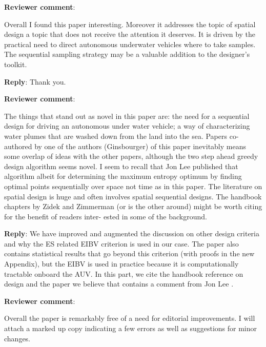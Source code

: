 \documentclass[a4paper]{article}
\newcounter{reviewer}
\def\revcom{\textbf{Reviewer comment}}
\def\reply{\textbf{Reply}}
\begin{document}
\setcounter{reviewer}{1}

\begin{answers}


\item{\revcom  :}\label{r1c3}

Overall I found this paper interesting. Moreover it addresses the topic of spatial design a topic that does not receive the attention it deserves. It is driven by the practical need to direct autonomous underwater vehicles where to take samples. The sequential sampling strategy may be a valuable addition to the designer’s toolkit.

\reply: Thank you. 

\item{\revcom  :}\label{r1c3}

The things that stand out as novel in this paper are: the need for a sequential design for driving an autonomous under water vehicle; a way of characterizing water plumes that are washed down from the land into the sea. Papers co-authored by one of the authors (Ginsbourger) of this paper inevitably means some overlap of ideas with the other papers, although the two step ahead greedy design algorithm seems novel. I seem to recall that Jon Lee published that algorithm albeit for determining the maximum entropy optimum by finding optimal points sequentially over space not time as in this paper. The literature on spatial design is huge and often involves spatial sequential designs. The handbook chapters by Zidek and Zimmerman (or is the other around) might be worth citing for the benefit of readers inter- ested in some of the background.

\reply: We have improved and augmented the discussion on other design criteria and why the ES related EIBV criterion is used in our case. The paper also contains statistical results that go beyond this criterion (with proofs in the new Appendix), but the EIBV is used in practice because it is computationally tractable onboard the AUV. In this part, we cite the handbook reference on design \cite{zidek2019monitoring} and the paper we believe that contains a comment from Jon Lee \citep{bueso1998state}.  

\item{\revcom  :}\label{r1c3}

Overall the paper is remarkably free of a need for editorial improvements. I will attach a marked up copy indicating a few errors as well as suggestions for minor changes.


\end{answers}
\end{document}

